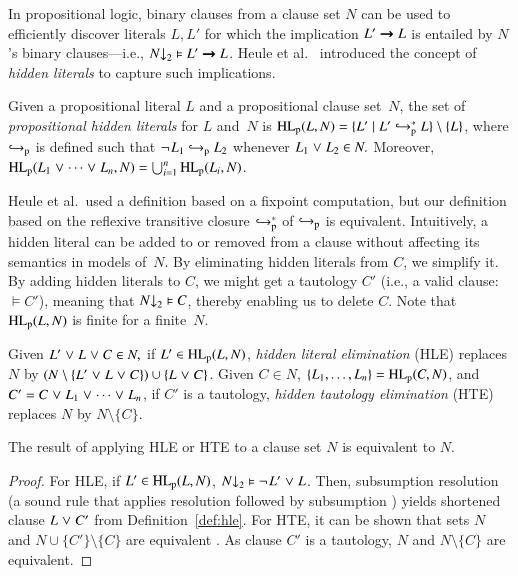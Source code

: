 In propositional logic, binary clauses from a clause set $N$ can be used to
efficiently discover literals $L, L'$ for which the implication $L' \impl L$
is entailed by $N$'s binary clauses---i.e., $\binset{N} \models L' \impl L$.
Heule et al.\ \cite{hjb-2011-big-simplification} introduced the concept of \emph{hidden
literals} to capture such implications.

\begin{defi}
   Given a propositional literal $L$ and a propositional clause set~$N$, the
   set of \emph{propositional hidden literals} for $L$ and~$N$ is
   $\PHL(L, N) = \{ L' \mid L' \bigpimpl{N}^\ast L \} \setminus \{ L \}$, where $\bigpimpl{N}$ is
   defined such that $\neglit{L_1} \bigpimpl{N} L_2$ whenever $L_1 \cor L_2 \in N.$
   Moreover, $\PHL(L_1 \cor \cdots \cor L_n, N) = \bigcup_{i=1}^n
   \PHL(L_i, N)$.
\end{defi}

Heule et al.\ used a definition based on a fixpoint computation, but our
definition based on the reflexive transitive closure $\bigpimpl{N}^\ast$ of $\bigpimpl{N}$ is equivalent. Intuitively,
a hidden literal can be added to or removed from a clause without affecting its
semantics in models of~$N.$ By eliminating hidden literals from $C$, we simplify
it. By adding hidden literals to $C$, we might get a tautology $C'$ (i.e., a
valid clause:\ $\models C'$), meaning that $\binset{N} \models C$, thereby
enabling us to delete $C$. Note that $\PHL(L,N)$ is finite for a finite~$N.$

\begin{defi}
   \label{def:hle}\label{def:hte}
   Given $L' \cor L \cor C \in N,$ if $L' \in
   \PHL(L, N)$, \emph{hidden literal elimination} (HLE) replaces $N$ by $(N
   \setminus \{L' \cor L \cor C\}) \cup \{L \cor C\}$.
   Given $C \in N$, $\{L_1,\dots,L_n\} = \PHL(C, N)$, and $C' = C \cor L_1 \cor
   \cdots \cor L_n$, if $C'$ is a tautology, \emph{hidden
   tautology elimination} (HTE) replaces $N$ by $N \setminus \{C\}$.
\end{defi}

\begin{theorem}
   The result of applying HLE or HTE to a clause set $N$ is
   equivalent to $N$.
\end{theorem}

\begin{proof}
For HLE, if $L' \in \PHL(L, N)$,  $\binset{N} \models \neglit{L'} \cor L$. Then,
subsumption resolution (a sound rule that applies resolution followed by
subsumption \cite{bg-01-resolution}) yields shortened clause $L \cor C'$ from
Definition~\ref{def:hle}. For HTE, it can be shown that sets $N$ and $N
\cup \{ C' \} \setminus \{C\}$ are equivalent
\cite[Sect.~2.1]{hjb-2011-big-simplification}. As clause $C'$ is a tautology,
$N$ and $N \setminus \{C\}$ are equivalent.\qedhere
\end{proof}

